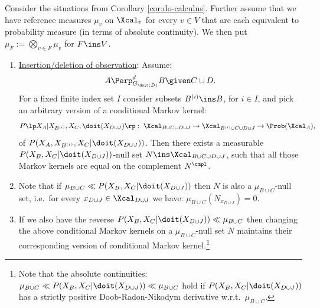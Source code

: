 \begin{Cor}
    \label{cor:as-do-calculus}
    Consider the situations from Corollary \ref{cor:do-calculus}.
    Further assume that we have reference measures $\mu_v$ on $\Xcal_v$ for every $v \in V$ that are each equivalent to probability measure (in terms of absolute continuity). 
    We then put $\mu_F := \bigotimes_{v \in F} \mu_v$ for $F \ins V$.
\begin{enumerate}
\item \underline{Insertion/deletion of observation}: Assume:
        \[ A \Perp^d_{G_{\doit(D)}} B \given C \cup D. \]
        For a fixed finite index set $I$ consider subsets $B^{(i)} \ins B$, for $i \in I$, and  pick an arbitrary version of a conditional Markov kernel:
            \[P\lp X_A|X_{B^{(i)}},X_C,\doit(X_{D\cup J})\rp:\;\Xcal_{B \cup C \cup D \cup J} \to \Xcal_{B^{(i)} \cup C \cup D \cup J} \to \Prob(\Xcal_A), \]
            of $P(X_A,X_{B^{(i)}},X_C|\doit(X_{D\cup J}))$.
            Then there exists a measurable $P(X_B,X_C|\doit(X_{D\cup J}))$-null set
        $N \ins \Xcal_{B \cup C \cup D \cup J}$,
        such that all those Markov kernels are equal on the complement $N^\cmpl$.
    \item[] Note that if $\mu_{B \cup C} \ll P(X_B,X_C|\doit(X_{D\cup J}))$ then $N$ is also a $\mu_{B \cup C}$-null set, i.e.\ for every $x_{D \cup J} \in \Xcal_{D \cup J}$ we have:
        $\mu_{B \cup C} (N_{x_{D \cup J}}) =0.$
    \item[] If we also have the reverse $ P(X_B,X_C|\doit(X_{D\cup J})) \ll \mu_{B \cup C}$ then changing 
        the above conditional Markov kernels on a $\mu_{B \cup C}$-null set $N$ maintains their corresponding version of conditional Markov kernel.\footnote{Note that the absolute continuities: $\mu_{B \cup C}\ll P(X_B,X_C|\doit(X_{D\cup J})) \ll \mu_{B \cup C}$ hold if $P(X_B,X_C|\doit(X_{D\cup J}))$ has a strictly positive Doob-Radon-Nikodym derivative w.r.t.\ $\mu_{B \cup C}$.}


\end{enumerate}
\end{Cor}

